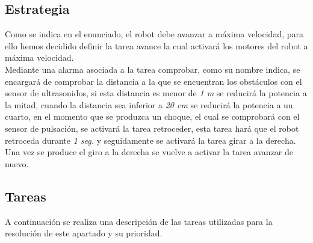 \subsection{Estrategia}
Como se indica en el enunciado, el robot debe avanzar a máxima velocidad, para ello hemos decidido definir la tarea avance la cual activará los motores del robot a máxima velocidad. \\

Mediante una alarma asociada a la tarea comprobar, como su nombre indica, se encargará de comprobar la distancia a la que se encuentran los obstáculos con el sensor de ultrasonidos, si esta distancia es menor de \textit{1 m} se reducirá la potencia a la mitad, cuando la distancia sea inferior a \textit{20 cm} se reducirá la potencia a un cuarto, en el momento que se produzca un choque, el cual se comprobará con el sensor de pulsación, se activará la tarea retroceder, esta tarea hará que el robot retroceda durante \textit{1 seg.} y seguidamente se activará la tarea girar a la derecha. Una vez se produce el giro a la derecha se vuelve a activar la tarea avanzar de nuevo.
\subsection{Tareas}
A continuación se realiza una descripción de las tareas utilizadas para la resolución de este apartado y su prioridad.

